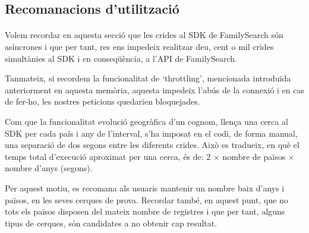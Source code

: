 \subsection{Recomanacions d'utilització}

    \paragraph{}
    Volem recordar en aquesta secció que les crides al SDK de FamilySearch són asíncrones i que per tant, res ens impedeix realitzar deu, cent o mil crides simultànies al SDK i en conseqüència, a l’API de FamilySearch.

    Tanmateix, si recordem la funcionalitat de `throttling', mencionada introduïda anteriorment en aquesta memòria, aquesta impedeix l’abús de la connexió i en cas de fer-ho, les nostres peticions quedarien bloquejades.

    Com que la funcionalitat evolució geogràfica d’un cognom, llença una cerca al SDK per cada país i any de l’interval, s'ha imposat en el codi, de forma manual, una separació de dos segons entre les diferents crides. Això es tradueix, en què el temps total d'execució aproximat per una cerca, és de: 2 $\times$ nombre de països $\times$ nombre d'anys (segons).

    Per aquest motiu, es recomana als usuaris mantenir un nombre baix d'anys i països, en les seves cerques de prova. Recordar també, en aquest punt, que no tots els països disposen del mateix nombre de registres i que per tant, alguns tipus de cerques, són candidates a no obtenir cap resultat.
